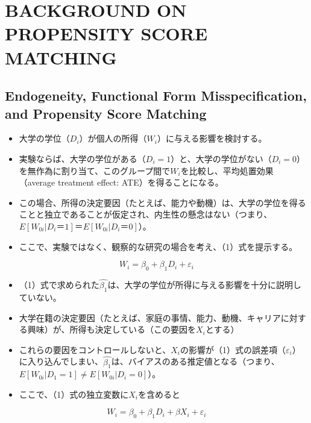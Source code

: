 
\section{BACKGROUND ON PROPENSITY SCORE MATCHING}

\subsection*{Endogeneity, Functional Form Misspecification, and Propensity Score Matching}

\begin{itemize}
 \item 大学の学位（$D_i$）が個人の所得（$W_i$）に与える影響を検討する。
 \item 実験ならば、大学の学位がある（$D_i=1$）と、大学の学位がない（$D_i=0$）を無作為に割り当て、このグループ間で$W_i$を比較し、平均処置効果（average treatment effect: ATE）を得ることになる。
 \item この場合、所得の決定要因（たとえば、能力や動機）は、大学の学位を得ることと独立であることが仮定され、内生性の懸念はない（つまり、$E[W_{0i} | D_i＝1]＝E[W_{0i} | D_{i}＝0]$）。
 \item ここで、実験ではなく、観察的な研究の場合を考え、（1）式を提示する。
\end{itemize}

\begin{equation}
W_i = \beta_0 + \beta_1 D_i + \varepsilon_i
\end{equation}

\begin{itemize}
 \item （1）式で求められた$\hat{\beta_1}$は、大学の学位が所得に与える影響を十分に説明していない。
 \item 大学在籍の決定要因（たとえば、家庭の事情、能力、動機、キャリアに対する興味）が、所得も決定している（この要因を$X_i$とする）
 \item これらの要因をコントロールしないと、$X_i$の影響が（1）式の誤差項（$\varepsilon_i$）に入り込んでしまい、$\hat{\beta_1}$は、バイアスのある推定値となる（つまり、$E[W_{0i} | D_1=1] \neq E[W_{0i} | D_i=0]$）。
 \item ここで、（1）式の独立変数に$X_i$を含めると
\end{itemize}

\begin{equation}
W_i = \beta_0 + \beta_1 D_i + \beta X_i + \varepsilon_i
\end{equation}

